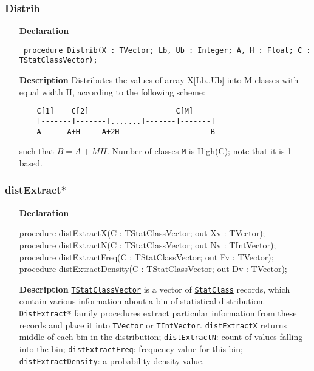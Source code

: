 \documentclass[12pt,a4paper,oneside]{report}
\newcommand{\lmatha}[1]{   %
	\marginpar{\vspace{#1} 
		\begin{flushright}
			LMath 0.5
	\end{flushright} }
}
\newcommand{\declarationitem}[1]{\textbf{#1}}
\newcommand{\descriptiontitle}[1]{\textbf{#1}}
\newcommand{\code}[1]{\texttt{#1}}
\begin{document}
\subsubsection{Distrib}
\label{udistrib-Distrib}
\begin{itemize}\item[\declarationitem{Declaration}\hfill]
	\begin{flushleft}
		\code{
			procedure Distrib(X : TVector; Lb, Ub : Integer; A,  H : Float; C : TStatClassVector);}
	\end{flushleft}
	\item[\descriptiontitle{Description}]
	Distributes the values of array X[Lb..Ub] into M classes with equal width H, according to the following scheme:
	\begin{verbatim}
	C[1]    C[2]                    C[M]
	]-------]-------].......]-------]-------]
	A      A+H     A+2H                     B
	\end{verbatim}	
	such that $ B = A + M H$. Number of classes \code{M} is High(C); note that it is 1-based.
\end{itemize}
\subsubsection{distExtract*}\lmatha{-24pt}
\label{udistrib-distExtract}
\begin{itemize}
	\item[\declarationitem{Declaration}\hfill]
	\begin{flushleft}
procedure distExtractX(C : TStatClassVector; out Xv : TVector);\\
procedure distExtractN(C : TStatClassVector; out Nv : TIntVector);\\
procedure distExtractFreq(C : TStatClassVector; out Fv : TVector);\\
procedure distExtractDensity(C : TStatClassVector; out Dv : TVector);
	\end{flushleft}
	\item[\descriptiontitle{Description}]
	\hyperref[utypes-TStatClassVector]{\code{TStatClassVector}} is a vector of \hyperref[sec:statclass]{\code{StatClass}} records, which contain various information about a bin of statistical distribution.
	\code{DistExtract*} family procedures extract particular information from these records and place it into \code{TVector} or \code{TIntVector}. \code{distExtractX} returns middle of each bin in the distribution; \code{distExtractN}: count of values falling into the bin; \code{distExtractFreq}: frequency value for this bin; \code{distExtractDensity}: a probability density value.
\end{itemize}	
\end{document}
